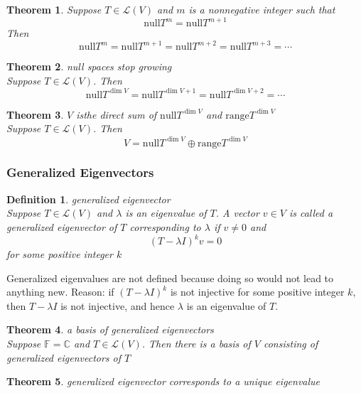 \documentclass{article}
\newtheorem{theorem}{Theorem}[subsection]
\newtheorem{definition}{Definition}[subsection]
\newcommand{\CC}{\mathbb{C}}
\newcommand{\FF}{\mathbb{F}}
\newcommand{\range}{\text{range}}
\newcommand{\n}{\text{null}}
\begin{document}
\begin{CJK}{UTF8}{gkai}
\begin{theorem}
    Suppose $T \in \mathcal{L}(V)$ and $m$ is a nonnegative integer such that
    \[\n T^m = \n T^{m+1}\]
    Then
    \[\n T^m = \n T^{m+1} = \n T^{m+2} = \n T^{m+3} = \cdots\]
\end{theorem}

\begin{theorem}
    null spaces stop growing\\

    Suppose $T \in \mathcal{L}(V)$. Then
    \[\n T^{ \dim V} = \n T^{ \dim V+1} = \n T^{\dim V+2} = \cdots\]
\end{theorem}

\begin{theorem}
    $V$ isthe direct sum of $\n T^{ \dim V}$ and $\range T^{ \dim V}$\\

    Suppose $T \in \mathcal{L}(V)$. Then
    \[V =\n T^{ \dim V} \oplus \range T^{ \dim V}\]
\end{theorem}

\subsubsection{Generalized Eigenvectors}

\begin{definition}
    generalized eigenvector\\

    Suppose $T \in \mathcal{L}(V)$ and $\lambda$ is an eigenvalue of $T$. A vector $v \in V$ is called a generalized eigenvector of $T$ corresponding to $\lambda$ if $v \neq 0$ and
    \[(T - \lambda I)^k v = 0\]
    for some positive integer $k$
\end{definition}

Generalized eigenvalues are not defined because doing so would not lead to anything new. Reason: if $(T - \lambda I)^k$ is not injective for some positive integer $k$, then $T - \lambda I$ is not injective, and hence $\lambda$ is an eigenvalue of $T$.

\begin{theorem}
    a basis of generalized eigenvectors\\

    Suppose $\FF = \CC$ and $T \in \mathcal{L}(V)$. Then there is a basis of $V$ consisting of generalized eigenvectors of $T$
\end{theorem}

\begin{theorem}
    generalized eigenvector corresponds to a unique eigenvalue\\


\end{theorem}
\end{CJK}
\end{document}
